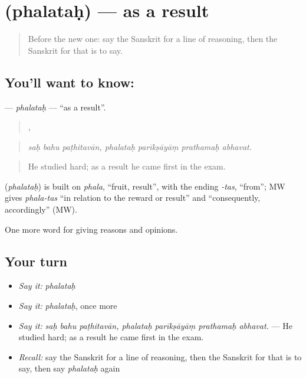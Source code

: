 \section[\texorpdfstring{\sk{फलतः} (phalataḥ)}{फलतः (phalataḥ)}]{ (phalataḥ) — as a result}

\label{lesson:SA-C342-phalatah}



\begin{quote}
Before the new one: say the Sanskrit for a line of reasoning, then the Sanskrit for that is to say.
\end{quote}

\subsection*{You'll want to know: }
\textbf{} — \emph{phalataḥ} — \textquotedblleft{}as a result\textquotedblright{}.

\begin{quote}
  ,    
\end{quote}

\begin{quote}
\emph{saḥ bahu paṭhitavān, phalataḥ parīkṣāyāṃ prathamaḥ abhavat.}
\end{quote}

\begin{quote}
He studied hard; as a result he came first in the exam.
\end{quote}

\begin{cousinweb}
\textbf{} (\emph{phalataḥ}) is built on \emph{phala}, \textquotedblleft{}fruit, result\textquotedblright{}, with the ending \emph{-tas}, \textquotedblleft{}from\textquotedblright{}; MW gives \emph{phala-tas} \textquotedblleft{}in relation to the reward or result\textquotedblright{} and \textquotedblleft{}consequently, accordingly\textquotedblright{} (MW).
\end{cousinweb}

\begin{grammarlens}[title={What you've built}]
One more word for giving reasons and opinions.
\end{grammarlens}

\subsection*{Your turn}
\begin{itemize}
\raggedright
  \item \emph{Say it:} \emph{phalataḥ}
  \item \emph{Say it:} \emph{phalataḥ}, once more
  \item \emph{Say it:} \emph{saḥ bahu paṭhitavān, phalataḥ parīkṣāyāṃ prathamaḥ abhavat.} — He studied hard; as a result he came first in the exam.
  \item \emph{Recall:} say the Sanskrit for a line of reasoning, then the Sanskrit for that is to say, then say \emph{phalataḥ} again
\end{itemize}

